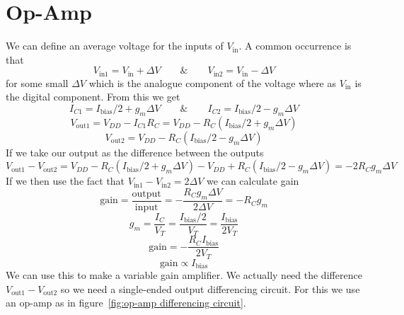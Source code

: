 \documentclass{article}
\begin{document}
    \section{Op-Amp}
    We can define an average voltage for the inputs of \(V_\text{in}\). 
    A common occurrence is that 
    \[V_\text{in1} = V_\text{in} + \Delta V \qquad \& \qquad V_\text{in2} = V_\text{in} - \Delta V\]
    for some small \(\Delta V\) which is the analogue component of the voltage where as \(V_\text{in}\) is the digital component.
    From this we get 
    \[I_{C1} = I_\text{bias}/2 + g_m\Delta V \qquad \& \qquad I_{C2} = I_\text{bias}/2 - g_m\Delta V\]
    \[V_\text{out1} = V_{DD} - I_{C1}R_C = V_{DD} - R_C(I_\text{bias}/2 + g_m\Delta V)\]
    \[V_\text{out2} = V_{DD} - R_C(I_\text{bias}/2 - g_m\Delta V)\]
    If we take our output as the difference between the outputs
    \[V_\text{out1} - V_\text{out2} = V_{DD} - R_C(I_\text{bias}/2 + g_m\Delta V) - V_{DD} + R_C(I_\text{bias}/2 - g_m\Delta V) = -2R_Cg_m\Delta V\]
    If we then use the fact that \(V_\text{in1} - V_\text{in2} = 2\Delta V\) we can calculate gain
    \[\text{gain} = \frac{\text{output}}{\text{input}} = -\frac{R_Cg_m\Delta V}{2\Delta V} = -R_Cg_m\]
    \[g_m = \frac{I_C}{V_T} = \frac{I_\text{bias}/2}{V_T} = \frac{I_\text{bias}}{2V_T}\]
    \[\text{gain} = -\frac{R_CI_\text{bias}}{2V_T}\]
    \[\text{gain} \propto I_\text{bias}\]
    We can use this to make a variable gain amplifier. 
    We actually need the difference \(V_\text{out1} - V_\text{out2}\) so we need a single-ended output differencing circuit.
    For this we use an op-amp as in figure~\ref{fig:op-amp differencing circuit}.\label{text reference differencing circuit}
    
\end{document}
